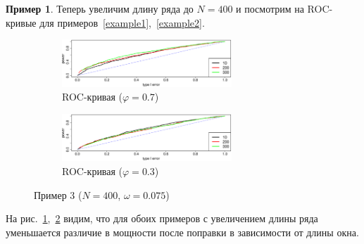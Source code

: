 \documentclass[specialist,
substylefile = spbu_report.rtx,
subf,href,colorlinks=true, 12pt]{disser}
\theoremstyle{definition}
\newtheorem{example}{Пример}
\begin{document}
\begin{example}\label{example3}
	Теперь увеличим длину ряда до $N=400$ и посмотрим на ROC-кривые для примеров~\ref{example1},~\ref{example2}.
	\begin{figure}[h!]
		\captionsetup[subfigure]{justification=Centering}
		\begin{subfigure}[t]{\textwidth}
			\centering
			\includegraphics[width=0.7\textwidth]{../cps2024/images/roc_phi7_N400.eps}
			\caption{ROC-кривая ($\varphi=0.7$)}
			\label{roc_phi7_N400}
		\end{subfigure}
		\begin{subfigure}[t]{\textwidth}
			\centering
			\includegraphics[width=0.7\textwidth]{../cps2024/images/roc_phi3_N400.eps}
			\caption{ROC-кривая ($\varphi=0.3$)}
			\label{roc_phi3_N400}
		\end{subfigure}
	\label{fig:example3}
	\caption{Пример 3 ($N=400$, $\omega=0.075$)}
	\end{figure}
	На рис.~\ref{roc_phi7_N400},~\ref{roc_phi3_N400} видим, что для обоих примеров с увеличением длины ряда уменьшается различие в мощности после поправки в зависимости от длины окна.
\end{example}
\end{document}
